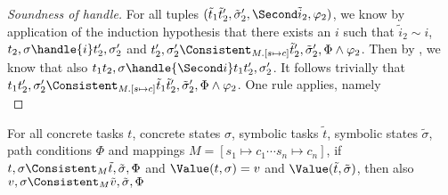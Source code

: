 \begin{proof}[Soundness of handle]
{  For all tuples $(\tilde{t}_1\And\tilde{t}_2',\tilde{\sigma}_2',\Second \tilde{i}_2,\phi_2)$,
  we know by application of the induction hypothesis that there exists an $i$ such that
  $\tilde{i}_2\sim i$, $t_2,\sigma\handle{i}t_2',\sigma_2'$ and
  $t_2',\sigma_2'\Consistent_{M.[s\mapsto c]}\tilde{t}_2',\tilde{\sigma}_2',\Phi\land\phi_2$.
  Then by , we know that also $t_1\And t_2,\sigma\handle{\Second i}t_1\And t_2',\sigma_2'$.
  It follows trivially that $t_1\And t_2',\sigma_2'\Consistent_{M.[s\mapsto c]}\tilde{t}_1\And \tilde{t}_2',\tilde{\sigma}_2',\Phi\land\phi_2$.
}
%
{One rule applies, namely \\
%
%
%
%
%
%
}

\end{proof}


\begin{lemma}
  \label{lem:valpres}
  For all concrete tasks $t$, concrete states $\sigma$, symbolic tasks $\tilde{t}$, symbolic states $\tilde{\sigma}$, path conditions $\Phi$ and mappings $M=[s_1\mapsto c_1\cdots s_n\mapsto c_n]$,
  if $t,\sigma\Consistent_M\tilde{t},\tilde{\sigma},\Phi$ and $\Value(t,\sigma)=v$ and $\Value(\tilde{t},\tilde{\sigma})$,
  then also $v,\sigma\Consistent_M\tilde{v},\tilde{\sigma},\Phi$
\end{lemma}

